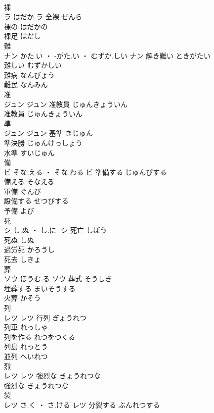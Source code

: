 \documentclass[8pt]{extreport}
\begin{document}
\begin{CJK}{UTF8}{min}
\\	裸	
\\	ラ	はだか	ラ	全裸	ぜんら	
\\	裸の	はだかの	
\\	裸足	はだし	
\\	難	
\\	ナン	かた.い ・ -がた.い ・ むずか.しい	ナン	解き難い	ときがたい	
\\	難しい	むずかしい	
\\	難病	なんびょう	
\\	難民	なんみん	
\\	准	
\\	ジュン		ジュン	准教員	じゅんきょういん	
\\	准教員	じゅんきょういん	
\\	準	
\\	ジュン		ジュン	基準	きじゅん	
\\	準決勝	じゅんけっしょう	
\\	水準	すいじゅん	
\\	備	
\\	ビ	そな.える ・ そな.わる	ビ	準備する	じゅんびする	
\\	備える	そなえる	
\\	軍備	ぐんび	
\\	設備する	せつびする	
\\	予備	よび	
\\	死	
\\	シ	し.ぬ ・ し.に-	シ	死亡	しぼう	
\\	死ぬ	しぬ	
\\	過労死	かろうし	
\\	死去	しきょ	
\\	葬	
\\	ソウ	ほうむ.る	ソウ	葬式	そうしき	
\\	埋葬する	まいそうする	
\\	火葬	かそう	
\\	列	
\\	レツ		レツ	行列	ぎょうれつ	
\\	列車	れっしゃ	
\\	列を作る	れつをつくる	
\\	列島	れっとう	
\\	並列	へいれつ	
\\	烈	
\\	レツ		レツ	強烈な	きょうれつな	
\\	強烈な	きょうれつな	
\\	裂	
\\	レツ	さ.く ・ さ.ける	レツ	分裂する	ぶんれつする	

\end{CJK}
\end{document}
